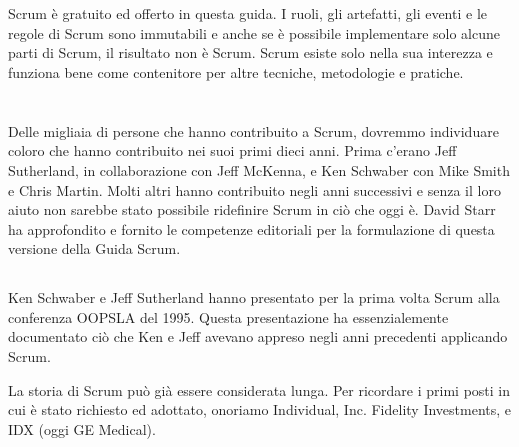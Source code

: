 
\section*{\color{Blue}{Conclusioni}}
\label{sec:conclusion}
Scrum è gratuito ed offerto in questa guida. I ruoli, gli artefatti, gli eventi e le regole di Scrum sono immutabili e anche se \`e possibile implementare solo alcune parti di Scrum, il risultato non \`e Scrum. Scrum esiste solo nella sua interezza e funziona bene come contenitore per altre tecniche, metodologie e pratiche.


\section*{\color{Blue}{Ringraziamenti}}
\label{sec:acknowledgements}

\subsection*{\color{SteelBlue}{Persone}}
\label{sec:people}
Delle migliaia di persone che hanno contribuito a Scrum, dovremmo individuare coloro che hanno contribuito nei suoi
primi dieci anni. Prima c'erano Jeff Sutherland, in collaborazione con Jeff McKenna, e Ken Schwaber con Mike Smith e
Chris Martin. Molti altri hanno contribuito negli anni successivi e senza il loro aiuto non sarebbe stato possibile ridefinire Scrum in ci\`o che oggi \`e. David Starr ha approfondito e fornito le competenze editoriali per la formulazione di questa versione della Guida Scrum.

\subsection*{\color{SteelBlue}{Storia}}
\label{sec:history}
Ken Schwaber e Jeff Sutherland hanno presentato per la prima volta Scrum alla conferenza OOPSLA del 1995. Questa presentazione ha essenzialemente documentato ci\`o che Ken e Jeff avevano appreso negli anni precedenti applicando Scrum.

La storia di Scrum pu\`o gi\`a essere considerata lunga. Per ricordare i primi posti in cui \`e stato richiesto ed adottato, onoriamo Individual, Inc. Fidelity Investments, e IDX (oggi GE Medical).

